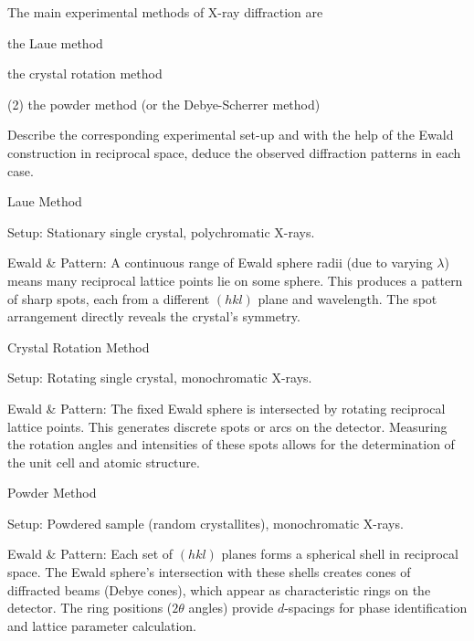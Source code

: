 \begin{problem}
  The main experimental methods of X-ray diffraction are
  \begin{enumext*}[label = (\alph*), columns = 2]
    \item the Laue method
    \item the crystal rotation method
    \item(2) the powder method (or the Debye-Scherrer method)
  \end{enumext*}
  Describe the corresponding experimental set-up and with the help of the Ewald
  construction in reciprocal space, deduce the observed diffraction patterns in
  each case.
\end{problem}
\begin{solution}\leavevmode
  \begin{enumext}
    \item Laue Method
    \begin{enumext}
      \item Setup: Stationary single crystal, polychromatic X-rays.
      \item Ewald \& Pattern: A continuous range of Ewald sphere radii (due to
      varying $\lambda$) means many reciprocal lattice points lie on some
      sphere. This produces a pattern of sharp spots, each from a different
      $(hkl)$ plane and wavelength. The spot arrangement directly reveals the
      crystal's symmetry.
    \end{enumext}
    \item Crystal Rotation Method
    \begin{enumext}
      \item Setup: Rotating single crystal, monochromatic X-rays.
      \item Ewald \& Pattern: The fixed Ewald sphere is intersected by rotating
      reciprocal lattice points. This generates discrete spots or arcs on the
      detector. Measuring the rotation angles and intensities of these spots
      allows for the determination of the unit cell and atomic structure.
    \end{enumext}
    \item Powder Method
    \begin{enumext}
      \item Setup: Powdered sample (random crystallites), monochromatic X-rays.
      \item Ewald \& Pattern: Each set of $(hkl)$ planes forms a spherical shell
      in reciprocal space. The Ewald sphere's intersection with these shells
      creates cones of diffracted beams (Debye cones), which appear as
      characteristic rings on the detector. The ring positions
      ($2\theta$ angles) provide $d$-spacings for phase identification and
      lattice parameter calculation.
    \end{enumext}
  \end{enumext}
\end{solution}